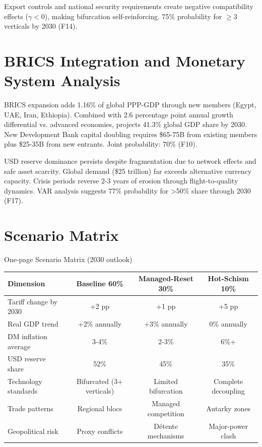 \documentclass{article}
\newenvironment{landscapetable}{\begin{landscape}\small}{\end{landscape}}
\begin{document}
Export controls and national security requirements create negative compatibility effects ($\gamma < 0$), making bifurcation self-reinforcing. 75\% probability for $\geq$3 verticals by 2030 (F14).

\section{BRICS Integration and Monetary System Analysis}

BRICS expansion adds 1.16\% of global PPP-GDP through new members (Egypt, UAE, Iran, Ethiopia). Combined with 2.6 percentage point annual growth differential vs. advanced economies, projects 41.3\% global GDP share by 2030. New Development Bank capital doubling requires \$65-75B from existing members plus \$25-35B from new entrants. Joint probability: 70\% (F10).

USD reserve dominance persists despite fragmentation due to network effects and safe asset scarcity. Global demand (\$25 trillion) far exceeds alternative currency capacity. Crisis periods reverse 2-3 years of erosion through flight-to-quality dynamics. VAR analysis suggests 77\% probability for >50\% share through 2030 (F17).

\section{Scenario Matrix}

\begin{landscapetable}
\captionsetup{type=table}
\caption*{One‑page Scenario Matrix (2030 outlook)}
\begin{tabular}{lccc}
\toprule
\textbf{Dimension} & \textbf{Baseline 60\%} & \textbf{Managed-Reset 30\%} & \textbf{Hot-Schism 10\%} \\
\midrule
Tariff change by 2030 & +2 pp & +1 pp & +5 pp \\
Real GDP trend & +2\% annually & +3\% annually & 0\% annually \\
DM inflation average & 3-4\% & 2-3\% & 6\%+ \\
USD reserve share & 52\% & 45\% & 35\% \\
Technology standards & Bifurcated (3+ verticals) & Limited bifurcation & Complete decoupling \\
Trade patterns & Regional blocs & Managed competition & Autarky zones \\
Geopolitical risk & Proxy conflicts & Détente mechanisms & Major-power clash \\
\bottomrule
\end{tabular}
\end{landscapetable}
\end{document}
